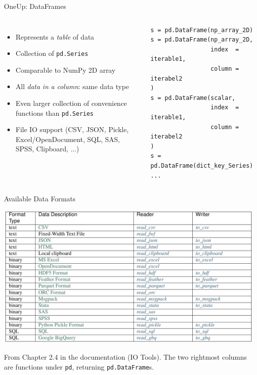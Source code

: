 
\begin{frame}[fragile]{OneUp: DataFrames}
%
\begin{columns}[T]
\begin{itemize}
\item Represents a \emph{table} of data
\item Collection of \texttt{pd.Series}
\item Comparable to NumPy 2D array
\item All \emph{data in a column}: same data type
\item Even larger collection of convenience functions than \texttt{pd.Series}
\item File IO support (CSV, JSON, Pickle, Excel/OpenDocument, SQL, SAS, SPSS, Clipboard, ...)
\end{itemize}
%
\begin{codebox}
\begin{verbatim}
s = pd.DataFrame(np_array_2D)
s = pd.DataFrame(np_array_2D,
                 index  = iterable1,
                 column = iterabel2
)
s = pd.DataFrame(scalar,
                 index  = iterable1,
                 column = iterabel2
)
s = pd.DataFrame(dict_key_Series)
...
\end{verbatim}
\end{codebox}
%
\end{columns}
%
\end{frame}


\begin{frame}{Available Data Formats}
%
\begin{center}
	\includegraphics[width=.75\linewidth]{./gfx/pandas-filecompat}
\end{center}
%
\scriptsize
From Chapter 2.4 in the documentation (IO Tools). The two rightmost columns are functions under \texttt{pd}, returning \texttt{pd.DataFrame}s.
%
\end{frame}


